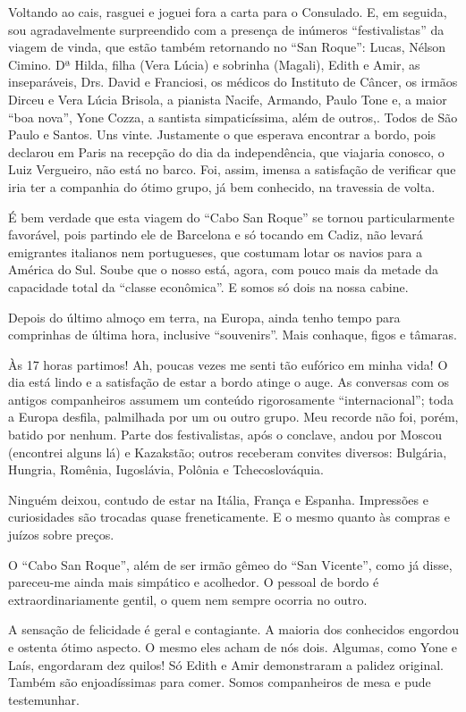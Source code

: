 Voltando ao cais, rasguei e joguei fora a carta para o Consulado. E, em seguida, sou agradavelmente surpreendido com a presença de inúmeros “festivalistas” da viagem de vinda, que estão também retornando no “San Roque”: Lucas, Nélson Cimino. Dª Hilda, filha (Vera Lúcia) e sobrinha (Magali), Edith e Amir, as inseparáveis, Drs. David e Franciosi, os médicos do Instituto de Câncer, os irmãos Dirceu e Vera Lúcia Brisola, a pianista Nacife, Armando, Paulo Tone e, a maior “boa nova”, Yone Cozza, a santista simpaticíssima, além de outros,. Todos de São Paulo e Santos. Uns vinte. Justamente o que esperava encontrar a bordo, pois declarou em Paris na recepção do dia da independência, que viajaria conosco, o Luiz Vergueiro, não está no barco. Foi, assim, imensa a satisfação de verificar que iria ter a companhia do ótimo grupo, já bem conhecido, na travessia de volta.

É bem verdade que esta viagem do “Cabo San Roque” se tornou particularmente favorável, pois partindo ele de Barcelona e só tocando em Cadiz, não levará emigrantes italianos nem portugueses, que costumam lotar os navios para a América do Sul. Soube que o nosso está, agora, com pouco mais da metade da capacidade total da “classe econômica”. E somos só dois na nossa cabine.

Depois do último almoço em terra, na Europa, ainda tenho tempo para comprinhas de última hora, inclusive “souvenirs”. Mais conhaque, figos e tâmaras.

Às 17 horas partimos! Ah, poucas vezes me senti tão eufórico em minha vida! O dia está lindo e a satisfação de estar a bordo atinge o auge. As conversas com os antigos companheiros assumem um conteúdo rigorosamente “internacional”; toda a Europa desfila, palmilhada por um ou outro grupo. Meu recorde não foi, porém, batido por nenhum. Parte dos festivalistas, após o conclave, andou por Moscou (encontrei alguns lá) e Kazakstão; outros receberam convites diversos: Bulgária, Hungria, Romênia, Iugoslávia, Polônia e Tchecoslováquia.

Ninguém deixou, contudo de estar na Itália, França e Espanha. Impressões e curiosidades são trocadas quase freneticamente. E o mesmo quanto às compras e juízos sobre preços.

O “Cabo San Roque”, além de ser irmão gêmeo do “San Vicente”, como já disse, pareceu-me ainda mais simpático e acolhedor. O pessoal de bordo é extraordinariamente gentil, o quem nem sempre ocorria no outro.

A sensação de felicidade é geral e contagiante. A maioria dos conhecidos engordou e ostenta ótimo aspecto. O mesmo eles acham de nós dois. Algumas, como Yone e Laís, engordaram dez quilos! Só Edith e Amir demonstraram a palidez original. Também são enjoadíssimas para comer. Somos companheiros de mesa e pude testemunhar.

